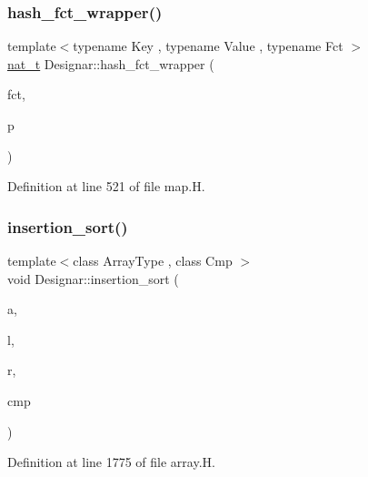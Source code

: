 \subsubsection{\texorpdfstring{hash\+\_\+fct\+\_\+wrapper()}{hash\_fct\_wrapper()}}
{\footnotesize\ttfamily template$<$typename Key , typename Value , typename Fct $>$ \\
\hyperlink{namespace_designar_aa72662848b9f4815e7bf31a7cf3e33d1}{nat\+\_\+t} Designar\+::hash\+\_\+fct\+\_\+wrapper (\begin{DoxyParamCaption}\item[{Fct}]{fct,  }\item[{const \hyperlink{namespace_designar_a7394b1b25278abf7211e77b91eb5204f}{Map\+Key}$<$ Key, Value $>$ \&}]{p }\end{DoxyParamCaption})\hspace{0.3cm}{\ttfamily [inline]}}



Definition at line 521 of file map.\+H.

\mbox{\label{namespace_designar_a9fec85a7dda46bb4840bf066c8483853}} 
\subsubsection{\texorpdfstring{insertion\+\_\+sort()}{insertion\_sort()}\hspace{0.1cm}{\footnotesize\ttfamily [1/6]}}
{\footnotesize\ttfamily template$<$class Array\+Type , class Cmp $>$ \\
void Designar\+::insertion\+\_\+sort (\begin{DoxyParamCaption}\item[{Array\+Type \&}]{a,  }\item[{\hyperlink{namespace_designar_a9d113d66a39e82b73727c72cd3a52f73}{lint\+\_\+t}}]{l,  }\item[{\hyperlink{namespace_designar_a9d113d66a39e82b73727c72cd3a52f73}{lint\+\_\+t}}]{r,  }\item[{Cmp \&}]{cmp }\end{DoxyParamCaption})}



Definition at line 1775 of file array.\+H.

\mbox{\label{namespace_designar_ab2f897d6db2113316fee5efcd50a459d}} 
